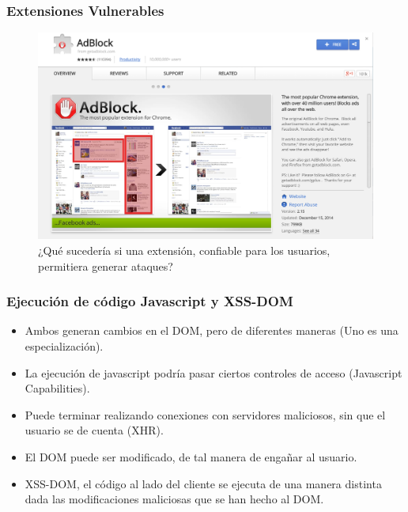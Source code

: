\documentclass[serif,9pt]{beamer}
\begin{document}
\begin{frame}
	\frametitle{Extensiones Vulnerables}
	\begin{figure}[h]
        \centering
        \includegraphics[scale=0.15]{figures/Adblock.png}
        \caption{¿Qu\'e suceder\'ia si una extensi\'on, confiable para los usuarios, permitiera generar ataques?}
        \label{fig:vulnExt}
    \end{figure}
\end{frame}

\begin{frame}
	\frametitle{Ejecuci\'on de c\'odigo Javascript y XSS-DOM}
		\begin{itemize}
			\item<1-> Ambos generan cambios en el DOM, pero de diferentes maneras (Uno es una especializaci\'on).
			\item<2-> La ejecuci\'on de javascript podr\'ia pasar ciertos controles de acceso (Javascript Capabilities).
			\item<3-> Puede terminar realizando conexiones con servidores maliciosos, sin que el usuario se de cuenta (XHR).
			\item<4-> El DOM puede ser modificado, de tal manera de engañar al usuario.
			\item<5-> XSS-DOM, el c\'odigo al lado del cliente se ejecuta de una manera distinta dada las modificaciones maliciosas que se han hecho al DOM.
		\end{itemize}
\end{frame}
\end{document}
